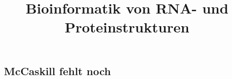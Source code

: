 \documentclass[12pt,a4paper]{article}
\title{\Huge\textbf{Bioinformatik von RNA- und Proteinstrukturen}}
\author{}
\date{}
\begin{document}
\begin{titlepage}

\maketitle
\thispagestyle{empty}
\end{titlepage}
\newpage

\begin{titlepage}
\tableofcontents
\thispagestyle{empty}
\end{titlepage}
\newpage



\newpage



\newpage



\newpage



\newpage



\newpage



\newpage



\newpage


\newpage



\subsection{McCaskill fehlt noch}

\newpage



\newpage


\end{document}
